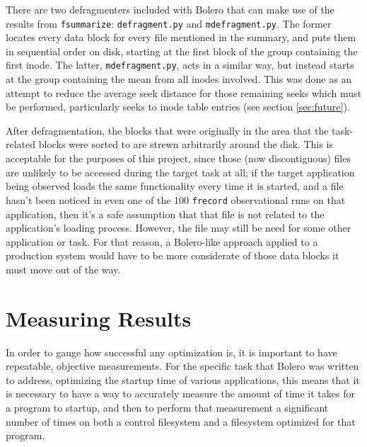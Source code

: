 \documentclass[10pt,twocolumn,letterpaper]{article}
\begin{document}
There are two defragmenters included with Bolero that can make use of the results from \texttt{fsummarize}:
\texttt{defragment.py} and \texttt{mdefragment.py}. The former locates every data block for every file mentioned
in the summary, and puts them in sequential order on disk, starting at the first block of the group containing
the first inode. The latter, \texttt{mdefragment.py}, acts in a similar way, but instead starts at the group containing the mean from all inodes involved. This was done as an attempt to reduce the average seek distance for
those remaining seeks which must be performed, particularly seeks to inode table entries (see section \ref{sec:future}).

After defragmentation, the blocks that were originally in the area that the task-related blocks were sorted to
are strewn arbitrarily around the disk. This is acceptable for the purposes of this project, since those (now
discontiguous) files are unlikely to be accessed during the target task at all; if the target application being observed loads the same functionality every time it is started, and a file hasn't been noticed
in even one of the 100 \texttt{frecord} observational runs on that application, then it's a safe assumption that that file is not related to the application's loading process. However, the file may still be need for some other application or task. For that reason, a Bolero-like approach applied to a production system would have to be more considerate of those data blocks it must move out of the way.

\section{Measuring Results}\label{sec:results}

In order to gauge how successful any optimization is, it is important to have
repeatable, objective measurements. For the specific task that Bolero was written
to address, optimizing the startup time of various applications, this means that it
is necessary to have a way to accurately measure the amount of time it takes for
a program to startup, and then to perform that measurement a significant
number of times on both a control filesystem and a filesystem optimized for that program.
\end{document}
